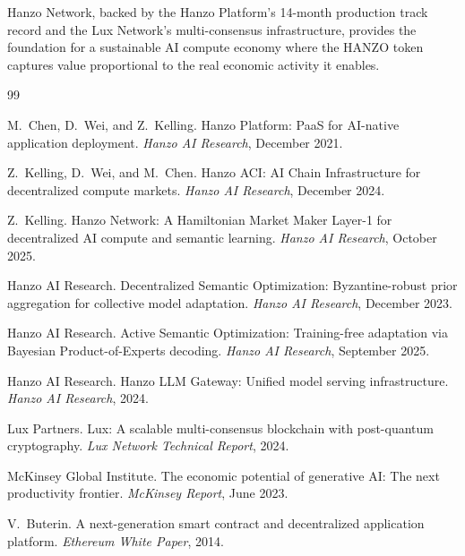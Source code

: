 \documentclass[11pt]{article}
\begin{document}
Hanzo Network, backed by the Hanzo Platform's 14-month production track record
and the Lux Network's multi-consensus infrastructure, provides the foundation for
a sustainable AI compute economy where the HANZO token captures value
proportional to the real economic activity it enables.

\begin{thebibliography}{99}

M.~Chen, D.~Wei, and Z.~Kelling.
\newblock Hanzo Platform: {PaaS} for {AI}-native application deployment.
\newblock \emph{Hanzo AI Research}, December 2021.

Z.~Kelling, D.~Wei, and M.~Chen.
\newblock Hanzo {ACI}: {AI} Chain Infrastructure for decentralized compute markets.
\newblock \emph{Hanzo AI Research}, December 2024.

Z.~Kelling.
\newblock Hanzo Network: A {Hamiltonian} Market Maker {Layer-1} for decentralized {AI} compute and semantic learning.
\newblock \emph{Hanzo AI Research}, October 2025.

{Hanzo AI Research}.
\newblock Decentralized Semantic Optimization: {Byzantine}-robust prior aggregation for collective model adaptation.
\newblock \emph{Hanzo AI Research}, December 2023.

{Hanzo AI Research}.
\newblock Active Semantic Optimization: Training-free adaptation via {Bayesian} Product-of-Experts decoding.
\newblock \emph{Hanzo AI Research}, September 2025.

{Hanzo AI Research}.
\newblock Hanzo {LLM} Gateway: Unified model serving infrastructure.
\newblock \emph{Hanzo AI Research}, 2024.

{Lux Partners}.
\newblock Lux: A scalable multi-consensus blockchain with post-quantum cryptography.
\newblock \emph{Lux Network Technical Report}, 2024.

{McKinsey Global Institute}.
\newblock The economic potential of generative {AI}: The next productivity frontier.
\newblock \emph{McKinsey Report}, June 2023.

V.~Buterin.
\newblock A next-generation smart contract and decentralized application platform.
\newblock \emph{Ethereum White Paper}, 2014.


\end{thebibliography}
\end{document}
